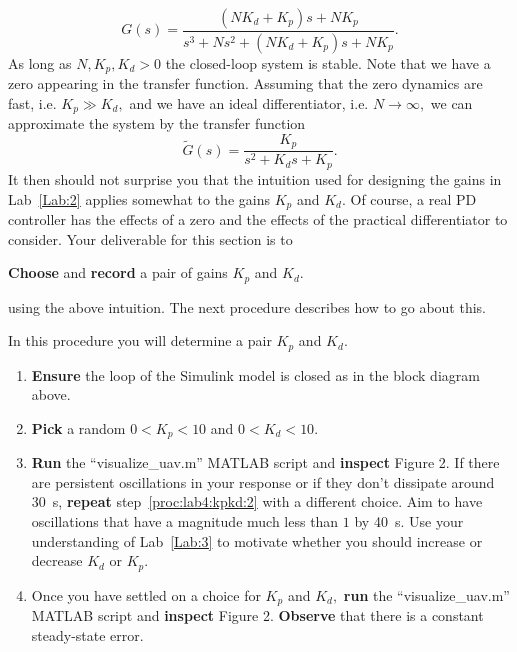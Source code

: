 \[
  G(s) = \frac{\left(N K_d + K_p\right)s + N K_p}{s^3 + N s^2 + \left(N K_d + K_p\right) s + N K_p}.
\]
As long as \(N, K_p, K_d > 0\) the closed-loop system is stable.
Note that we have a zero appearing in the transfer function.
Assuming that the zero dynamics are fast, i.e. \(K_p \gg K_d,\) and we have an ideal differentiator, i.e. \(N \to \infty,\) we can approximate the system by the transfer function
\[
  \tilde{G}(s) = \frac{K_p}{s^2 + K_d s + K_p}.
\]
It then should not surprise you that the intuition used for designing the gains in Lab~\ref{Lab:2} applies somewhat to the gains \(K_p\) and \(K_d.\)
Of course, a real PD controller has the effects of a zero and the effects of the practical differentiator to consider.
Your deliverable for this section is to
%
\begin{deliverable}[label={del:lab4:p1:1}]
  \textbf{Choose} and \textbf{record} a pair of gains \(K_p\) and \(K_d.\)
\end{deliverable}
%
using the above intuition.
The next procedure describes how to go about this.
%
\begin{procedure}[label={proc:lab4:kpkd}]
  In this procedure you will determine a pair \(K_p\) and \(K_d.\)
  \begin{enumerate}[label={(\arabic*)}]
    \item{%
      \textbf{Ensure} the loop of the Simulink model is closed as in the block diagram above.
    }
    \item{%
      \textbf{Pick} a random \(0 < K_p < 10\) and \(0 < K_d < 10.\)
      \label{proc:lab4:kpkd:2}
    }
    \item{%
      \textbf{Run} the ``visualize\_uav.m'' MATLAB script and \textbf{inspect} Figure 2.
      If there are persistent oscillations in your response or if they don't dissipate around \SI{30}{s}, \textbf{repeat} step~\ref{proc:lab4:kpkd:2} with a different choice.
      Aim to have oscillations that have a magnitude much less than \(1\) by \SI{40}{s}.
      Use your understanding of Lab~\ref{Lab:3} to motivate whether you should increase or decrease \(K_d\) or \(K_p.\)
    }
    \item{%
      Once you have settled on a choice for \(K_p\) and \(K_d,\)
      \textbf{run} the ``visualize\_uav.m'' MATLAB script and \textbf{inspect} Figure 2.
      \textbf{Observe} that there is a constant steady-state error.
    }
  \end{enumerate}
\end{procedure}

